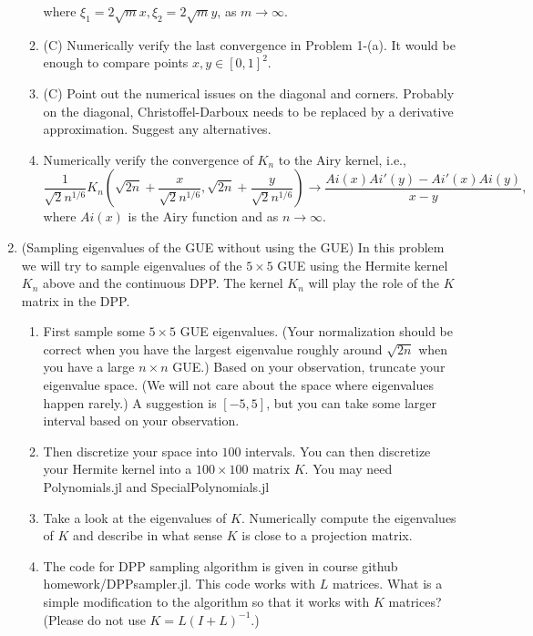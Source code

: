\documentclass{article}
\begin{document}
\begin{enumerate}
\begin{enumerate}
\begin{equation*}
        \end{equation*}
        where $\xi_1 = 2\sqrt{m}x, \xi_2 = 2\sqrt{m}y$, as $m\to\infty$.
        \item (C) Numerically verify the last convergence in Problem 1-(a). It would be enough to compare points $x, y\in[0,1]^2$.
        \item (C) Point out the numerical issues on the diagonal and corners. Probably on the diagonal, Christoffel-Darboux needs to be replaced by a derivative approximation. Suggest any alternatives. 
        \item Numerically verify the convergence of $K_n$ to the Airy kernel, i.e., 
        \begin{equation*}
            \frac{1}{\sqrt{2}n^{1/6}}K_n(\sqrt{2n}+\frac{x}{\sqrt{2}n^{1/6}}, \sqrt{2n}+\frac{y}{\sqrt{2}n^{1/6}}) \to \frac{Ai(x)Ai'(y)-Ai'(x)Ai(y)}{x-y},
        \end{equation*}
        where $Ai(x)$ is the Airy function and as $n\to \infty$. 
    \end{enumerate}
    \item (Sampling eigenvalues of the GUE without using the GUE) In this problem we will try to sample eigenvalues of the $5\times 5$ GUE using the Hermite kernel $K_n$ above and the continuous DPP. The kernel $K_n$ will play the role of the $K$ matrix in the DPP. 
    \begin{enumerate}
        \item First sample some $5\times 5$ GUE eigenvalues. (Your normalization should be correct when you have the largest eigenvalue roughly around $\sqrt{2n}$ when you have a large $n\times n$ GUE.) Based on your observation, truncate your eigenvalue space. (We will not care about the space where eigenvalues happen rarely.) A suggestion is $[-5, 5]$, but you can take some larger interval based on your observation.  
        \item Then discretize your space into $100$ intervals. You can then discretize your Hermite kernel into a $100\times 100$ matrix $K$. You may need Polynomials.jl and SpecialPolynomials.jl
        \item Take a look at the eigenvalues of $K$. Numerically compute the eigenvalues of $K$ and describe in what sense $K$ is close to a projection matrix. 
        \item The code for DPP sampling algorithm is given in course github homework/DPPsampler.jl. This code works with $L$ matrices. What is a simple modification to the algorithm so that it works with $K$ matrices? (Please do not use $K=L(I+L)^{-1}$.) 

\end{enumerate}
\end{enumerate}
\end{document}
